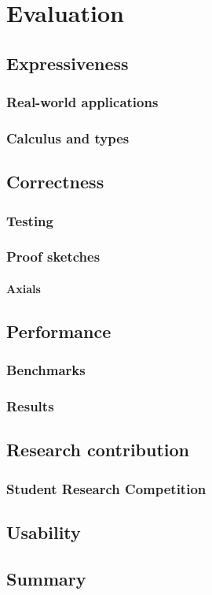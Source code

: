 \chapter{Evaluation}

\section{Expressiveness}

\subsection{Real-world applications}

\subsection{Calculus and types}

\section{Correctness}

\subsection{Testing}

\subsection{Proof sketches}

\subsubsection{Axials}

\section{Performance}

\subsection{Benchmarks}

\subsection{Results}

\section{Research contribution}

\subsection{Student Research Competition}

\section{Usability}

\section{Summary}
